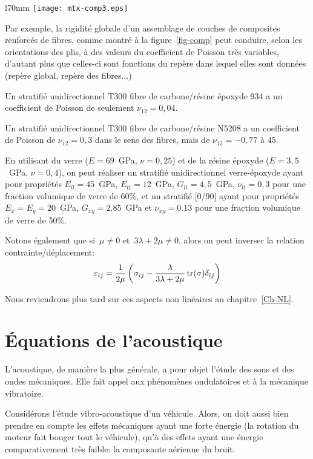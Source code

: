\medskip
\begin{wrapfigure}{l}{70mm}
  \centering
  \texttt{[image: mtx-comp3.eps]}
  \caption{Matériau composite}\label{fig-comp}
\end{wrapfigure}
Par exemple, la rigidité globale d'un assemblage de couches de composites renforcés de fibres, comme montré à la figure~\ref{fig-comp} peut conduire, selon les orientations des plis, à des valeurs du coefficient de Poisson très variables, d'autant plus que celles-ci sont fonctions du repère dans lequel elles sont données (repère global, repère des fibres...)

Un stratifié unidirectionnel T300 fibre de carbone/résine époxyde 934 a un coefficient de Poisson de seulement $\nu_{12}=0,04$.

Un stratifié unidirectionnel T300 fibre de carbone/résine N5208 a un coefficient de Poisson de $\nu_{12}=0,3$ dans le sens des fibres, mais de $\nu_{12}=-0,77$ à 45\degres.

En utilisant du verre ($E=69$~GPa, $\nu=0,25$) et de la résine époxyde ($E=3,5$~GPa, $\nu=0,4$), on peut réaliser un stratifié unidirectionnel verre-époxyde ayant pour propriétés $E_{ll}=45$~GPa, $E_{tt}=12$~GPa, $G_{lt}=4,5$~GPa, $\nu_{lt}=0,3$ pour une fraction volumique de verre de 60\%, et un stratifié [0/90] ayant pour propriétés $E_x=E_y=20$~GPa, $G_{xy}=2.85$~GPa et $\nu_{xy}=0.13$ pour une fraction volumique de verre de 50\%.


\medskip
Notons également que si~$\mu\ne0$ et~$3\lambda+2\mu\ne0$, alors on peut inverser la
relation contrainte/dé\-pla\-ce\-ment:
\begin{equation}
\varepsilon_{ij}=\dfrac1{2\mu}\left(\sigma_{ij}-\dfrac\lambda{3\lambda+2\mu}\operatorname{tr}(\sigma)\delta_{ij}\right)
\end{equation}

\medskip
Nous reviendrons plus tard sur ces aspects non linéaires au chapitre~\ref{Ch-NL}.


\medskip
\section{Équations de l'acoustique}
L'acoustique, de manière la plus générale, a pour objet l'étude des sons et des ondes mécaniques.  Elle fait appel aux phénomènes ondulatoires et à la mécanique vibratoire.

Considérons l'étude vibro-acoustique d'un véhicule. Alors, on doit aussi bien prendre en compte les effets mécaniques ayant une forte énergie (la rotation du moteur fait bouger tout le véhicule), qu'à des effets ayant une énergie comparativement très faible: la composante aérienne du bruit. 

